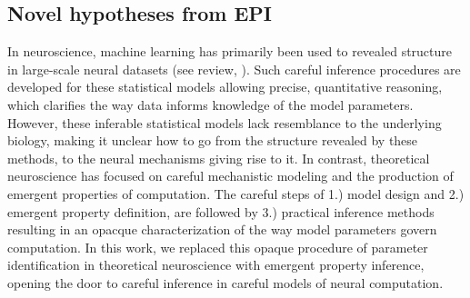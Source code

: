 \documentclass[11pt]{article}
\begin{document}
\subsection{Novel hypotheses from EPI} 
In neuroscience, machine learning has primarily been used to revealed structure in large-scale neural datasets \cite{kass2001spike, brown1998statistical, paninski2004maximum, byron2009gaussian, latimer2015single, duncker2019learning} (see review, \cite{paninski2018neural}).  Such careful inference procedures are developed for these statistical models allowing precise, quantitative reasoning, which clarifies the way data informs knowledge of the model parameters.  However, these inferable statistical models lack resemblance to the underlying biology, making it unclear how to go from the structure revealed by these methods, to the neural mechanisms giving rise to it.  In contrast, theoretical neuroscience has focused on careful mechanistic modeling and the production of emergent properties of computation.  The careful steps of 1.) model design and 2.) emergent property definition, are followed by 3.) practical inference methods resulting in an opacque characterization of the way model parameters govern computation.  In this work, we replaced this opaque procedure of parameter identification in theoretical neuroscience with emergent property inference, opening the door to careful inference in careful models of neural computation.
\end{document}
